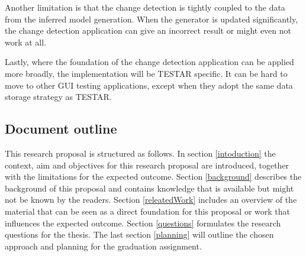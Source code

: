 Another limitation is that the change detection is tightly coupled to the data from the inferred model generation. When the generator is updated significantly, the change detection application can give an incorrect result or might even not work at all. 

Lastly, where the foundation of the change detection application can be applied more broadly, the implementation will be TESTAR specific. It can be hard to move to other GUI testing applications, except when they adopt the same data storage strategy as TESTAR. 

\subsection{Document outline}
This research proposal is structured as follows. In section \ref{intoduction} the context, aim and objectives for this research proposal are introduced, together with the limitations for the expected outcome. Section \ref{background} describes the background of this proposal and contains knowledge that is available but might not be known by the readers. Section \ref{releatedWork} includes an overview of the material that can be seen as a direct foundation for this proposal or work that influences the expected outcome. Section \ref{questions} formulates the research questions for the thesis. The last section \ref{planning} will outline the chosen approach and planning for the graduation assignment.